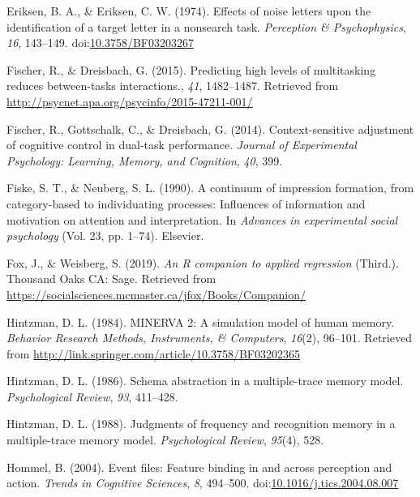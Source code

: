 \documentclass[english,,man,floatsintext]{apa6}
\begin{document}
\leavevmode\hypertarget{ref-eriksen_effects_1974}{}%
Eriksen, B. A., \& Eriksen, C. W. (1974). Effects of noise letters upon the identification of a target letter in a nonsearch task. \emph{Perception \& Psychophysics}, \emph{16}, 143--149. doi:\href{https://doi.org/10.3758/BF03203267}{10.3758/BF03203267}

\leavevmode\hypertarget{ref-fischer_predicting_2015}{}%
Fischer, R., \& Dreisbach, G. (2015). Predicting high levels of multitasking reduces between-tasks interactions., \emph{41}, 1482--1487. Retrieved from \url{http://psycnet.apa.org/psycinfo/2015-47211-001/}

\leavevmode\hypertarget{ref-fischer_context-sensitive_2014}{}%
Fischer, R., Gottschalk, C., \& Dreisbach, G. (2014). Context-sensitive adjustment of cognitive control in dual-task performance. \emph{Journal of Experimental Psychology: Learning, Memory, and Cognition}, \emph{40}, 399.

\leavevmode\hypertarget{ref-fiske_continuum_1990}{}%
Fiske, S. T., \& Neuberg, S. L. (1990). A continuum of impression formation, from category-based to individuating processes: Influences of information and motivation on attention and interpretation. In \emph{Advances in experimental social psychology} (Vol. 23, pp. 1--74). Elsevier.

\leavevmode\hypertarget{ref-r_car_2019}{}%
Fox, J., \& Weisberg, S. (2019). \emph{An R companion to applied regression} (Third.). Thousand Oaks CA: Sage. Retrieved from \url{https://socialsciences.mcmaster.ca/jfox/Books/Companion/}

\leavevmode\hypertarget{ref-hintzman_minerva_1984}{}%
Hintzman, D. L. (1984). MINERVA 2: A simulation model of human memory. \emph{Behavior Research Methods, Instruments, \& Computers}, \emph{16}(2), 96--101. Retrieved from \url{http://link.springer.com/article/10.3758/BF03202365}

\leavevmode\hypertarget{ref-hintzman_schema_1986}{}%
Hintzman, D. L. (1986). Schema abstraction in a multiple-trace memory model. \emph{Psychological Review}, \emph{93}, 411--428.

\leavevmode\hypertarget{ref-hintzman_judgments_1988}{}%
Hintzman, D. L. (1988). Judgments of frequency and recognition memory in a multiple-trace memory model. \emph{Psychological Review}, \emph{95}(4), 528.

\leavevmode\hypertarget{ref-hommel_event_2004}{}%
Hommel, B. (2004). Event files: Feature binding in and across perception and action. \emph{Trends in Cognitive Sciences}, \emph{8}, 494--500. doi:\href{https://doi.org/10.1016/j.tics.2004.08.007}{10.1016/j.tics.2004.08.007}
\end{document}
